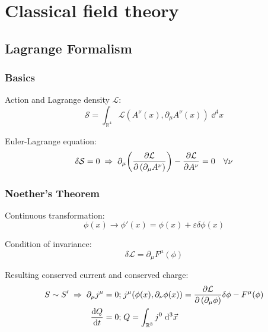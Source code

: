 \section{Classical field theory}
	\subsection{Lagrange Formalism}
		\subsubsection{Basics}
			\noindent
			Action and Lagrange density $\mathcal{L}$:
			\begin{equation}
				\mathcal{S} = \int_{\mathbb{R}^4} \mathcal{L}(A^\nu(x),\partial_\mu A^\nu(x)) \;\dd^4 x
			\end{equation}

			\noindent
			Euler-Lagrange equation:
			\begin{equation}
				\delta\mathcal{S} = 0
				\;\Rightarrow\; \partial_\mu \qty(\pdv{\mathcal{L}}{\left(\partial_\mu A^\nu\right)}) - \pdv{\mathcal{L}}{A^\nu} = 0 \quad\forall \nu
			\end{equation}

		\subsubsection{Noether's Theorem}
			\noindent
			Continuous transformation:
			\begin{equation}
				\phi(x)\rightarrow\phi'(x) = \phi(x) + \varepsilon \delta \phi(x)
			\end{equation}
			
			\noindent
			Condition of invariance:
			\begin{equation}
				\delta\mathcal{L} = \partial_\mu F^\mu(\phi)
			\end{equation}

			\noindent
			Resulting conserved current and conserved charge:
			\begin{equation}
				\begin{aligned}
					S \sim S' \;\Rightarrow\;\partial_\mu j^\mu = 0;&\; j^\mu \qty( \phi(x), \partial_\nu\phi(x) ) = \pdv{\mathcal{L}}{\left(\partial_\mu \phi\right)}\delta\phi - F^\mu(\phi) \\
					\dv{Q}{t} = 0;&\; Q = \int_{\mathbb{R}^3} j^0\;\dd^3\vec{x}
				\end{aligned}
			\end{equation}
